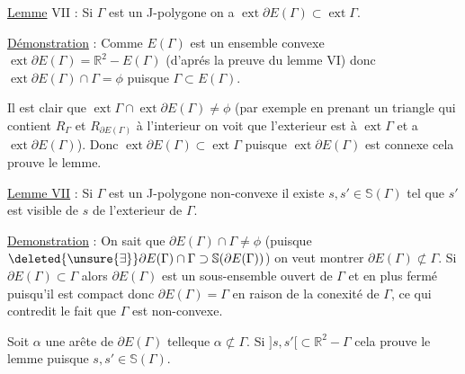 \uline{Lemme} VII : Si $\Gamma$ est un J-polygone on a $\operatorname{ext}\partial E(\Gamma)\subset\operatorname{ext}\Gamma$.

\uline{Démonstration} : Comme $E(\Gamma)$ est un ensemble convexe $\operatorname{ext}\partial E(\Gamma)=\mathbb{R}^{2}-E(\Gamma)$ (d'aprés la preuve du lemme VI) donc $\operatorname{ext}\partial E(\Gamma)\cap\Gamma=\phi$ puisque $\Gamma\subset E(\Gamma)$.

Il est clair que $\operatorname{ext}\Gamma\cap\operatorname{ext}\partial E(\Gamma)\ne\phi$ (par exemple en prenant un triangle qui contient $R_{\Gamma}$ et $R_{\partial E(\Gamma)}$ à l'interieur on voit que l'exterieur est  à  $\operatorname{ext}\Gamma$ et a $\operatorname{ext}\partial E(\Gamma)$). Donc $\operatorname{ext}\partial E(\Gamma)\subset\operatorname{ext}\Gamma$ puisque $\operatorname{ext}\partial E(\Gamma)$ est connexe  cela prouve le lemme.

\uline{Lemme VII} : Si $\Gamma$ est un \inserted{(}J-\inserted{)}polygone non-convexe il existe $s,s'\in\mathbb{S}(\Gamma)$ tel que  $s'$ est visible de $s$ de l'exterieur de $\Gamma$.

\uline{Demonstration} : On sait que $\partial E(\Gamma)\cap\Gamma\ne\phi$ (puisque $\deleted{\unsure{\exists}}\partial E(\Gamma)\cap\Gamma\supset\mathbb{S}(\partial E(\Gamma))$) on veut montrer  $\partial E(\Gamma)\not\subset\Gamma$. Si $\partial E(\Gamma)\subset\Gamma$ alors  $\partial E(\Gamma)$ est un sous-ensemble ouvert de $\Gamma$ et en plus fermé puisqu'il est compact donc $\partial E(\Gamma)=\Gamma$ en raison de la conexité de $\Gamma$, ce qui contredit le fait que $\Gamma$ est non-convexe.

Soit $\alpha$\inserted{$=[s,s']$} une arête de $\partial E(\Gamma)$ telleque $\alpha\not\subset\Gamma$. Si $]s,s'[\subset\mathbb{R}^{2}-\Gamma$ cela prouve le lemme puisque $s,s'\in\mathbb{S}(\Gamma)$.

